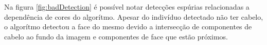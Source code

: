 \documentclass[journal,onecolumn]{IEEEtran}
\begin{document}
	Na figura \ref{fig:badDetection} é possível notar detecções espúrias relacionadas a dependência de cores do algorítmo.
	Apesar do indivíduo detectado não ter cabelo, o algorítmo detectou a face do mesmo devido a intersecção de componentes de cabelo ao fundo da imagem e componentes de face que estão próximos.
\begin{figure}[h]
\end{figure}
\end{document}
